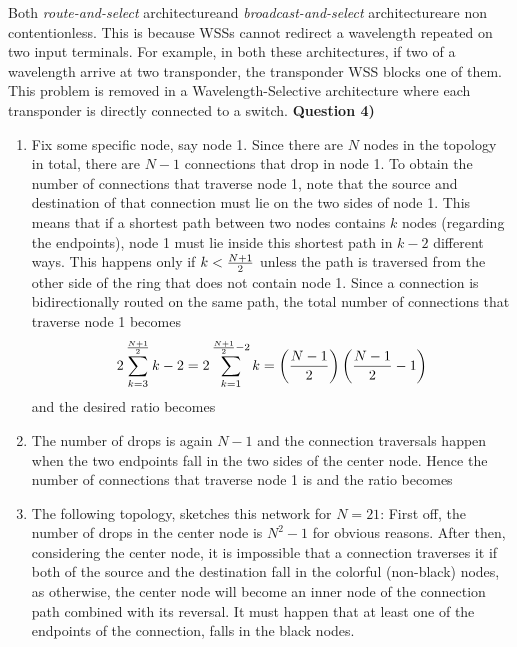 \documentclass[10pt,letterpaper]{article}
\newcommand{\bns}{\textit{broadcast-and-select}  architecture}
\newcommand{\rns}{\textit{route-and-select} architecture}
\newcommand{\Q}[1]{\textbf{Question #1)}}
\newcommand{\nl}{\newline\newline}
\begin{document}
Both \rns and \bns are non contentionless. This is because WSSs cannot redirect a wavelength repeated on two input terminals. For example, in both these architectures, if two of a wavelength arrive at two transponder, the transponder WSS blocks one of them. This problem is removed in a Wavelength-Selective architecture where each transponder is directly connected to a switch.
\nl
\Q4
\begin{enumerate}[label=\alph*)]
\item
Fix some specific node, say node 1. Since there are $N$ nodes in the topology in total, there are $N-1$ connections that drop in node 1. To obtain the number of connections that traverse node 1, note that the source and destination of that connection must lie on the two sides of node 1. This means that if a shortest path between two nodes contains $k$ nodes (regarding the endpoints), node 1 must lie inside this shortest path in $k-2$ different ways. This happens only if $k<{N+1\over 2}$ unless the path is traversed from the other side of the ring that does not contain node 1. Since a connection is bidirectionally routed on the same path, the total number of connections that traverse node 1 becomes
$$
2\sum_{k=3}^{{N+1\over 2}}k-2=2\sum_{k=1}^{{N+1\over 2}-2}k=\left({N-1\over 2}\right)\left({N-1\over 2}-1\right)
$$
and the desired ratio becomes
\item
The number of drops is again $N-1$ and the connection traversals happen when the two endpoints fall in the two sides of the center node. Hence the number of connections that traverse node 1 is
and the ratio becomes
\item
The following topology, sketches this network for $N=21$:
First off, the number of drops in the center node is $N^2-1$ for obvious reasons. After then, considering the center node, it is impossible that a connection traverses it if both of the source and the destination fall in the colorful (non-black)  nodes, as otherwise, the center node will become an inner node of the connection path combined with its reversal. It must happen that at least one of the endpoints of the connection, falls in the black nodes.


\end{enumerate}
\end{document}
